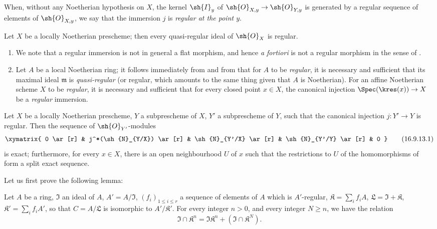 When, without any Noetherian hypothesis on $X$, the kernel $\sh{I}_y$ of $\sh{O}_{X,y} \to \sh{O}_{Y,y}$ is generated by a regular sequence of elements of $\sh{O}_{X,y}$, we say that the immersion $j$ is \emph{regular at the point $y$}.

\begin{corollary}[16.9.11]
\label{IV.16.9.11}
Let $X$ be a locally Noetherian prescheme;
then every quasi-regular ideal of $\sh{O}_X$ is regular.
\end{corollary}

\begin{remarks}[16.9.12]
\label{IV.16.9.12}
\begin{enumerate}
  \item[\rm{(i)}] We note that a regular immersion is not in general a flat morphism, and hence \textit{a fortiori} is not a regular morphism in the sense of .
  \item[\rm{(ii)}] Let $A$ be a local Noetherian ring;
  it follows immediately from  and from  that for $A$ to be \emph{regular}, it is necessary and sufficient that its maximal ideal $\mathfrak{m}$ is \emph{quasi-regular} (or regular, which amounts to the same thing given that $A$ is Noetherian).
  For an affine Noetherian scheme $X$ to be \emph{regular}, it is necessary and sufficient that for every closed point $x \in X$, the canonical injection $\Spec(\kres(x)) \to X$ be a \emph{regular} immersion.
\end{enumerate}
\end{remarks}

\begin{proposition}[16.9.13]
\label{IV.16.9.13}
Let $X$ be a locally Noetherian prescheme, $Y$ a subprescheme of $X$, $Y'$ a subprescheme of $Y$, such that the canonical injection $j:Y' \to Y$ is regular. 
Then the sequence of $\sh{O}_{Y'}$-modules
\[
  \label{IV.16.9.13.1}
  \xymatrix{
    0 \ar[r] & j^*(\sh{N}_{Y/X}) \ar[r] & \sh{N}_{Y'/X} \ar[r] & \sh{N}_{Y'/Y} \ar[r] & 0
  }
  \tag{16.9.13.1}
\]
is exact;
furthermore, for every $x \in X$, there is an open neighbourhood $U$ of $x$ such that the restrictions to $U$ of the homomorphisms of  form a split exact sequence.
\end{proposition}

Let us first prove the following lemma:

\begin{lemma}[16.9.13.2]
\label{IV.16.9.13.2}
Let $A$ be a ring, $\mathfrak{I}$ an ideal of $A$, $A' = A/\mathfrak{I}$, $(f_i)_{1 \leq i \leq r}$ a sequence of elements of $A$ which is $A'$-regular, $\mathfrak{K} = \sum_i f_i A$, $\mathfrak{L} = \mathfrak{I} + \mathfrak{K}$, $\mathfrak{K}' = \sum_i f_i A'$, so that $C = A/\mathfrak{L}$ is isomorphic to $A'/\mathfrak{K}'$.
For every integer $n > 0$, and every integer $N \geq n$, we have the relation
\[
  \label{IV.16.9.13.3}
  \mathfrak{I} \cap \mathfrak{K}^n = \mathfrak{I}\mathfrak{K}^n + (\mathfrak{I} \cap \mathfrak{K}^N).
  \tag{16.9.13.3}
\]
\end{lemma}

